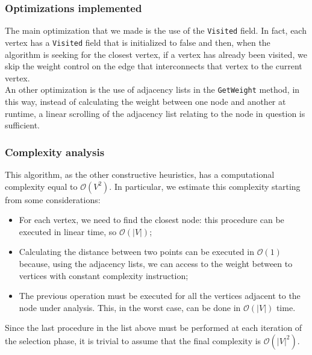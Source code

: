 \subsubsection{Optimizations implemented}
The main optimization that we made is the use of the \verb|Visited| field. In fact, each vertex has a \verb|Visited| field that is initialized to false and then, when the algorithm is seeking for the closest vertex, if a vertex has already been visited, we skip the weight control on the edge that interconnects that vertex to the current vertex. \\
An other optimization is the use of adjacency lists in the \verb|GetWeight| method, in this way, instead of calculating the weight between one node and another at runtime, a linear scrolling of the adjacency list relating to the node in question is sufficient.

\subsubsection{Complexity analysis}
This algorithm, as the other constructive heuristics, has a computational complexity equal to $\mathcal{O}(V^2)$. In particular, we estimate this complexity starting from some considerations:
\begin{itemize}
    \item For each vertex, we need to find the closest node: this procedure can be executed in linear time, so $\mathcal{O}(|V|)$;
    \item Calculating the distance between two points can be executed in $\mathcal{O}(1)$ because, using the adjacency lists, we can access to the weight between to vertices with constant complexity instruction;
    \item The previous operation must be executed for all the vertices adjacent to the node under analysis. This, in the worst case, can be done in $\mathcal{O}(|V|)$ time.
\end{itemize}

Since the last procedure in the list above must be performed at each iteration of the selection phase, it is trivial to assume that the final complexity is $\mathcal{O}(|V|^2)$.